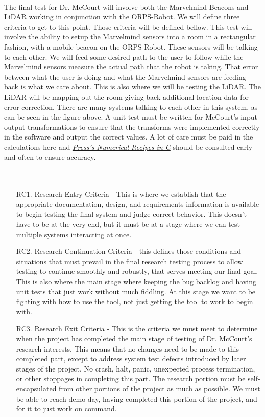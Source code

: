 \documentclass[english,12pt]{article}
\begin{document}
\\The final test for Dr. McCourt will involve both the Marvelmind Beacons and 
LiDAR working in conjunction with the ORPS-Robot. We will define three criteria 
to get to this point. Those criteria will be defined bellow. This test will involve 
the ability to setup the Marvelmind sensors into a room in a rectangular fashion, with 
a mobile beacon on the ORPS-Robot. These sensors will be talking to each other. We will 
feed some desired path to the user to follow while the Marvelmind sensors measure the actual 
path that the robot is taking.
That error between what the user is doing and what the Marvelmind 
sensors are feeding back is what we care about. This is also where we will be testing the LiDAR. The 
LiDAR will be mapping out the room giving back additional location data for error correction. There 
are many systems talking to each other in this system, as can be seen in the figure above. A unit test 
must be written for McCourt's input-output transformations to ensure that the transforms 
were implemented correctly in the software and output the correct values. A lot of care must be paid in the 
calculations here and \href{http://numerical.recipes/}{\textit{Press's Numerical Recipes in C}} should be 
consulted early and often to ensure accuracy.\\\\\\
\begin{itemize}
    \item[RC1.] Research Entry Criteria - This is where we establish that the appropriate 
    documentation, design, and requirements information is available to begin testing 
    the final system and judge correct behavior. This doesn't have to be at the very end, 
    but it must be at a stage where we can test multiple systems interacting at once.
    \item[RC2.] Research Continuation Criteria - this defines those conditions and situations that must 
    prevail in the final research testing process to allow testing to continue smoothly and robustly, that 
    serves meeting our final goal. This is also where the main stage where keeping the bug backlog 
    and having unit tests that just work without much fiddling. At this stage we want to be fighting 
    with how to use the tool, not just getting the tool to work to begin with.
    \item[RC3.] Research Exit Criteria  - This is the criteria we must meet to determine when the project has completed 
    the main stage of testing of Dr. McCourt’s research interests. This means that no changes need to be made to 
    this completed part, except to address system test defects introduced by later stages of the project. 
    No crash, halt, panic, unexpected process termination, or other stoppages in completing this part. The research 
    portion must be self-encapsulated from other portions of the project as much as possible. We must be able to reach 
    demo day, having completed this portion of the project, and for it to just work on command.
\end{itemize}
\newpage
\end{document}

